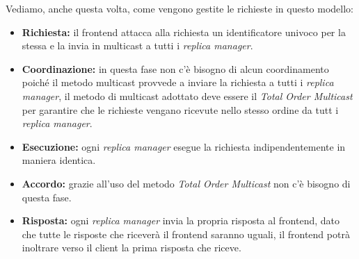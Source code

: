 \documentclass{article}
\begin{document}
Vediamo, anche questa volta, come vengono gestite le richieste in questo modello:
\begin{itemize}
    \item \textbf{Richiesta:} il frontend attacca alla richiesta un identificatore univoco per la stessa e la invia in multicast a tutti i \textit{replica manager}.
    \item \textbf{Coordinazione:} in questa fase non c'è bisogno di alcun coordinamento poiché il metodo multicast provvede a inviare la richiesta a tutti i \textit{replica manager}, il metodo di multicast adottato deve essere il \textit{Total Order Multicast} per garantire che le richieste vengano ricevute nello stesso ordine da tutt i \textit{replica manager}.
    \item \textbf{Esecuzione:} ogni \textit{replica manager} esegue la richiesta indipendentemente in maniera identica.
    \item \textbf{Accordo:} grazie all'uso del metodo \textit{Total Order Multicast} non c'è bisogno di questa fase.
    \item \textbf{Risposta:} ogni \textit{replica manager} invia la propria risposta al frontend, dato che tutte le risposte che riceverà il frontend saranno uguali, il frontend potrà inoltrare verso il client la prima risposta che riceve.
\end{itemize}
\end{document}
